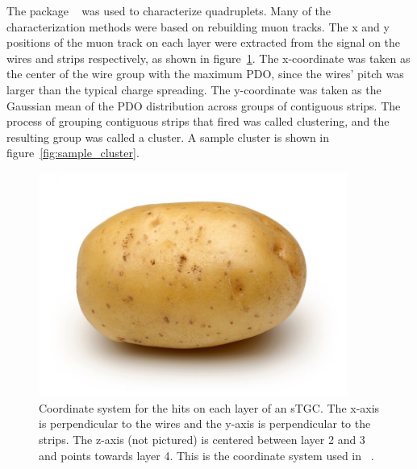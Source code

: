 The package ~\cite{lefebvre_tgc_analysis} was used to characterize quadruplets. Many of the characterization methods were based on rebuilding muon tracks. The x and y positions of the muon track on each layer were extracted from the signal on the wires and strips respectively, as shown in figure~\ref{fig:coord_system}. The x-coordinate was taken as the center of the wire group with the maximum PDO, since the wires' pitch was larger than the typical charge spreading. The y-coordinate was taken as the Gaussian mean of the PDO distribution across groups of contiguous strips. The process of grouping contiguous strips that fired was called clustering, and the resulting group was called a cluster. A sample cluster is shown in figure~\ref{fig:sample_cluster}.

\begin{figure}
    \centering
    \includegraphics[width = 0.9\textwidth]{figures/potato.jpg}
    \caption{Coordinate system for the hits on each layer of an sTGC. The x-axis is perpendicular to the wires and the y-axis is perpendicular to the strips. The z-axis (not pictured) is centered between layer 2 and 3 and points towards layer 4. This is the coordinate system used in ~\cite{lefebvre_tgc_analysis}.}
    \label{fig:coord_system}
\end{figure}

